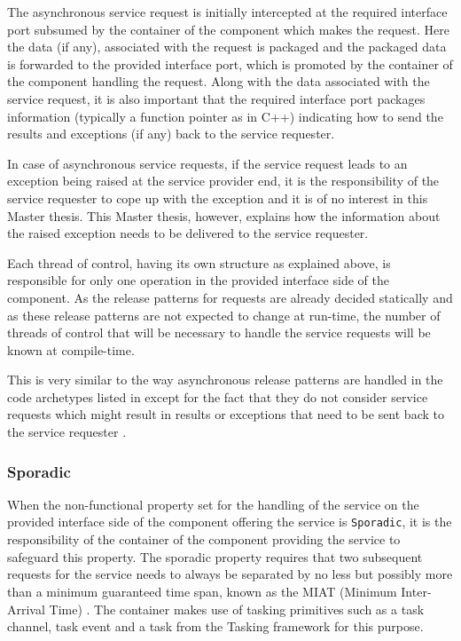 The asynchronous service request is initially intercepted at the required interface port subsumed by the container of the component which makes the request. Here the data (if any), associated with the request is packaged and the packaged data is forwarded to the provided interface port, which is promoted by the container of the component handling the request. Along with the data associated with the service request, it is also important that the required interface port packages information (typically a function pointer as in C++) indicating how to send the results and exceptions (if any) back to the service requester.

In case of asynchronous service requests, if the service request leads to an exception being raised at the service provider end, it is the responsibility of the service requester to cope up with the exception and it is of no interest in this Master thesis. This Master thesis, however, explains how the information about the raised exception needs to be delivered to the service requester. 

Each thread of control, having its own structure as explained above, is responsible for only one operation in the provided interface side of the component. As the release patterns for requests are already decided statically and as these release patterns are not expected to change at run-time, the number of threads of control that will be necessary to handle the service requests will be known at compile-time.

This is very similar to the way asynchronous release patterns are handled in the code archetypes listed in \cite{CharEvoRAVCodeAr}\cite{EvoRAVCodeAr} except for the fact that they do not consider service requests which might result in results or exceptions that need to be sent back to the service requester \cite{CharEvoRAVCodeAr}. 

\subsubsection{\textbf{Sporadic}}
When the non-functional property set for the handling of the service on the provided interface side of the component offering the service is \texttt{Sporadic}, it is the responsibility of the container of the component providing the service to safeguard this property. The sporadic property requires that two subsequent requests for the service needs to always be separated by no less but possibly more than a minimum guaranteed time span, known as the MIAT (Minimum Inter-Arrival Time) \cite{SpecMetamodel}\cite{CompBasedProcess}. The container makes use of tasking primitives such as a task channel, task event and a task from the Tasking framework for this purpose.

